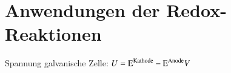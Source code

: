 \section{Anwendungen der Redox-Reaktionen}
   Spannung galvanische Zelle: $U = \ce{E^{Kathode}} - \ce{E^{Anode}} V$
